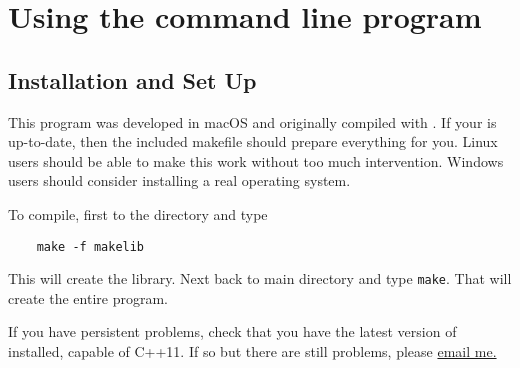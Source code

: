 \chapter{Using the command line program \label{chapter:grpulse}}

\section{Installation and Set Up}

This program was developed in macOS and originally compiled with .  If your  is up-to-date, then the included makefile should prepare everything for you.  Linux users should be able to make this work without too much intervention.  Windows users should consider installing a real operating system.

To compile, first  to the  directory and type
\begin{verbatim}
	make -f makelib
\end{verbatim}
This will create the library.  Next  back to main directory and type \verb+make+.  That will create the entire program.

If you have persistent problems, check that you have the latest version of  installed, capable of C++11.  If so but there are still problems, please \href{mailto:\myemail}{email me.}

